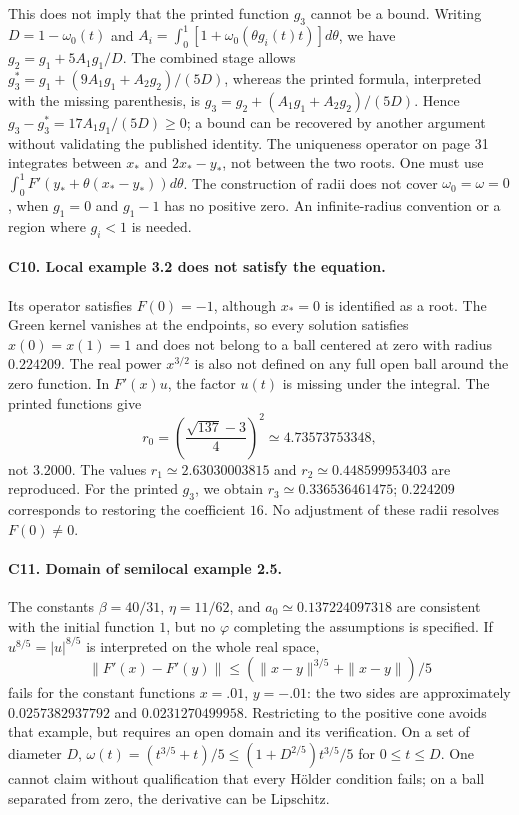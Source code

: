 \documentclass[11pt,a4paper]{article}
\numberwithin{equation}{section}
\numberwithin{table}{section}
\theoremstyle{plain}
\theoremstyle{definition}\newtheorem{definition}[theorem]{Definition}
\theoremstyle{remark}\newtheorem{remark}[theorem]{Remark}
\begin{document}
This does not imply that the printed function $g_3$ cannot be a bound.
Writing $D=1-\omega_0(t)$ and
$A_i=\int_0^1[1+\omega_0(\theta g_i(t)t)]d\theta$, we have
$g_2=g_1+5A_1g_1/D$. The combined stage allows
$g_3^*=g_1+(9A_1g_1+A_2g_2)/(5D)$, whereas the printed formula,
interpreted with the missing parenthesis, is
$g_3=g_2+(A_1g_1+A_2g_2)/(5D)$.
Hence $g_3-g_3^*=17A_1g_1/(5D)\geq0$; a bound can be recovered
by another argument without validating the published identity.
The uniqueness operator on page 31 integrates between $x_*$ and
$2x_*-y_*$, not between the two roots. One must use
$\int_0^1F'(y_*+\theta(x_*-y_*))d\theta$.
The construction of radii does not cover $\omega_0=\omega=0$, when
$g_1=0$ and $g_1-1$ has no positive zero. An infinite-radius
convention or a region where $g_i<1$ is needed.

\paragraph{C10. Local example 3.2 does not satisfy the equation.}
Its operator satisfies $F(0)=-1$, although $x_*=0$ is identified as
a root. The Green kernel vanishes at the endpoints, so every solution
satisfies $x(0)=x(1)=1$ and does not belong to a ball centered at zero
with radius $0.224209$. The real power $x^{3/2}$ is also not defined
on any full open ball around the zero function. In $F'(x)u$, the
factor $u(t)$ is missing under the integral. The printed functions give
\[
 r_0=\left(\frac{\sqrt{137}-3}{4}\right)^2\simeq4.73573753348,
\]
not $3.2000$. The values $r_1\simeq2.63030003815$ and
$r_2\simeq0.448599953403$ are reproduced. For the printed $g_3$,
we obtain $r_3\simeq0.336536461475$; $0.224209$ corresponds to
restoring the coefficient $16$. No adjustment of these radii
resolves $F(0)\neq0$.

\paragraph{C11. Domain of semilocal example 2.5.}
The constants $\beta=40/31$, $\eta=11/62$, and
$a_0\simeq0.137224097318$ are consistent with the initial function
$1$, but no $\varphi$ completing the assumptions is specified.
If $u^{8/5}=|u|^{8/5}$ is interpreted on the whole real space,
\[
 \|F'(x)-F'(y)\|\leq(\|x-y\|^{3/5}+\|x-y\|)/5
\]
fails for the constant functions $x=.01$, $y=-.01$: the two sides
are approximately $0.0257382937792$ and $0.0231270499958$.
Restricting to the positive cone avoids that example, but requires
an open domain and its verification. On a set of diameter $D$,
$\omega(t)=(t^{3/5}+t)/5\leq(1+D^{2/5})t^{3/5}/5$ for $0\leq t\leq D$.
One cannot claim without qualification that every H\"older condition
fails; on a ball separated from zero, the derivative can be Lipschitz.
\end{document}

